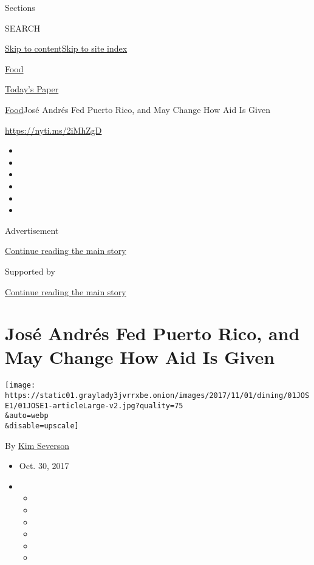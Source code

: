 Sections

SEARCH

\protect\hyperlink{site-content}{Skip to
content}\protect\hyperlink{site-index}{Skip to site index}

\href{https://www.nytimes3xbfgragh.onion/section/food}{Food}

\href{https://myaccount.nytimes3xbfgragh.onion/auth/login?response_type=cookie\&client_id=vi}{}

\href{https://www.nytimes3xbfgragh.onion/section/todayspaper}{Today's
Paper}

\href{/section/food}{Food}\textbar{}José Andrés Fed Puerto Rico, and May
Change How Aid Is Given

\url{https://nyti.ms/2iMhZgD}

\begin{itemize}
\item
\item
\item
\item
\item
\item
\end{itemize}

Advertisement

\protect\hyperlink{after-top}{Continue reading the main story}

Supported by

\protect\hyperlink{after-sponsor}{Continue reading the main story}

\hypertarget{josuxe9-andruxe9s-fed-puerto-rico-and-may-change-how-aid-is-given}{%
\section{José Andrés Fed Puerto Rico, and May Change How Aid Is
Given}\label{josuxe9-andruxe9s-fed-puerto-rico-and-may-change-how-aid-is-given}}

\texttt{[image: https://static01.graylady3jvrrxbe.onion/images/2017/11/01/dining/01JOSE1/01JOSE1-articleLarge-v2.jpg?quality=75\\\&auto=webp\\\&disable=upscale]}

By \href{http://www.nytimes3xbfgragh.onion/by/kim-severson}{Kim
Severson}

\begin{itemize}
\item
  Oct. 30, 2017
\item
  \begin{itemize}
  \item
  \item
  \item
  \item
  \item
  \item
  \end{itemize}
\end{itemize}

